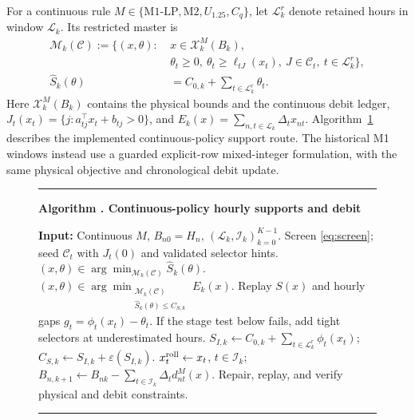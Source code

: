 \documentclass[10pt,journal]{IEEEtran}
\newcounter{procedure}
\newcommand{\Mtwo}{\mathrm{M2}}
\newcommand{\Mlp}{\mathrm{M1\text{-}LP}}
\begin{document}
For a continuous rule $M\in\{\Mlp,\Mtwo,U_{1.25},C_q\}$, let $\mathcal L_k^r$ denote retained hours in window $\mathcal L_k$. Its restricted master is
\begin{equation}
\begin{aligned}
\mathcal M_k(\mathcal C):=\{(x,\theta):\ &x\in\mathcal X_k^M(B_k),\\
&\theta_t\geq 0,\ \theta_t\geq\ell_{tJ}(x_t),\ J\in\mathcal C_t,\ t\in\mathcal L_k^r\},\\
\widehat S_k(\theta)&=C_{0,k}+\sum_{t\in\mathcal L_k^r}\theta_t.
\end{aligned}
\label{eq:masterfamily}
\end{equation}
Here $\mathcal X_k^M(B_k)$ contains the physical bounds and the continuous debit ledger, $J_t(x_t)=\{j:a_{tj}^{\top}x_t+b_{tj}>0\}$, and $E_k(x)=\sum_{n,t\in\mathcal L_k}\Delta_tx_{nt}$. Algorithm~\ref{alg:solve} describes the implemented continuous-policy support route. The historical M1 windows instead use a guarded explicit-row mixed-integer formulation, with the same physical objective and chronological debit update.
\begin{figure}[b]
\centering
\begin{minipage}{0.98\columnwidth}
\footnotesize\hrule\smallskip
{}\label{alg:solve}
\textbf{Algorithm \theprocedure. Continuous-policy hourly supports and debit}\par
\begin{algorithmic}[1]
\STATE \textbf{Input:} Continuous $M$, $B_{n0}=H_n$, $(\mathcal L_k,\mathcal I_k)_{k=0}^{K-1}$.
\STATE Screen \eqref{eq:screen}; seed $\mathcal C_t$ with $J_t(0)$ and validated selector hints.
\REPEAT
{}
\STATE $(x,\theta)\in\arg\min_{\mathcal M_k(\mathcal C)}\widehat S_k(\theta)$.
\ELSE
\STATE $(x,\theta)\in\arg\min_{\substack{\mathcal M_k(\mathcal C)\\\widehat S_k(\theta)\leq C_{S,k}}}E_k(x)$.
\ENDIF
\STATE Replay $S(x)$ and hourly gaps $g_t=\phi_t(x_t)-\theta_t$.
\STATE If the stage test below fails, add tight selectors at underestimated hours.
\STATE $S_{I,k}\gets C_{0,k}+\sum_{t\in\mathcal L_k^r}\phi_t(x_t)$; $C_{S,k}\gets S_{I,k}+\varepsilon(S_{I,k})$.
\ENDIF
\ENDFOR
\STATE $x_t^{\rm roll}\gets x_t$, $t\in\mathcal I_k$; $B_{n,k+1}\gets B_{nk}-\sum_{t\in\mathcal I_k}\Delta_td^M_{nt}(x)$.
\ENDFOR
\STATE Repair, replay, and verify physical and debit constraints.
\end{algorithmic}
\smallskip\hrule
\end{minipage}
\end{figure}
\end{document}
